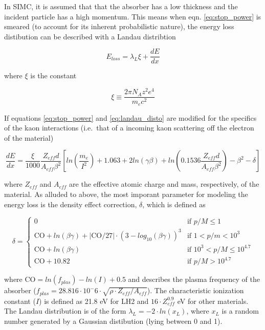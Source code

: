 \documentclass[
]{report}
\begin{document}
In SIMC, it is assumed that that the absorber has a low thickness and
the incident particle has a high momentum. This means when eqn.
\ref{eq:stop_power} is smeared (to account for its inherent
probabilistic nature), the energy loss distibution can be described with
a Landau distribtion

\begin{equation} 
  E_{loss}=\lambda_{L}\xi+\frac{dE}{dx}
  \label{eq:landau_disto} 
\end{equation}

\noindent where \(\xi\) is the constant

\begin{equation} 
  \xi\equiv\frac{2\pi N_Az^2e^4}{m_ec^2}
  \label{eq:xi_landau_disto} 
\end{equation}

\noindent If equations \ref{eq:stop_power} and \ref{eq:landau_disto} are
modified for the specifics of the kaon interactions (i.e.~that of a
incoming kaon scattering off the electron of the material)

\begin{equation} 
  \frac{dE}{dx}=\frac{\xi}{1000}\frac{Z_{eff}d}{A_{eff}\beta^2}[ln(\frac{m_e}{I^2})+1.063+2ln(\gamma\beta)+ln(0.1536\frac{Z_{eff}d}{A_{eff}\beta^2})-\beta^2-\delta]
  \label{eq:mod_stop_power} 
\end{equation}

\noindent where \(Z_{eff}\) and \(A_{eff}\) are the effective atomic
charge and mass, respectively, of the material. As alluded to above, the
most imporant parameter for modeling the energy loss is the density
effect correction, \(\delta\), which is defined as

\begin{equation} 
  \delta=
  \begin{cases}
    0 & \text{if } p/M\leq 1 \\
    \text{CO}+ln(\beta\gamma)+\left|\text{CO}/27\right|\cdot(3-log_{10}(\beta\gamma))^3 & \text{if } 1 < p/m < 10^3 \\
    \text{CO}+ln(\beta\gamma) & \text{if } 10^3 < p/M\leq 10^{4.7} \\
    \text{CO}+10.82 & \text{if } p/M > 10^{4.7}
    \end{cases}
  \label{eq:delta_density_corr} 
\end{equation}

\noindent where \(\text{CO}=ln(f_{plas})-ln(I)+0.5\) and describes the
plasma frequency of the absorber
(\(f_{plas}=28.816\cdot 10^-6\cdot\sqrt{\rho\cdot Z_{eff}/A_{eff}}\)).
The characteristic ionization constant (\(I\)) is defined as 21.8 eV for
LH2 and \(16\cdot Z^{0.9}_{eff}\) eV for other materials. The Landau
distribution is of the form \(\lambda_L=-2\cdot ln(x_L)\), where \(x_L\)
is a random number generated by a Gaussian distibution (lying between 0
and 1).
\end{document}
